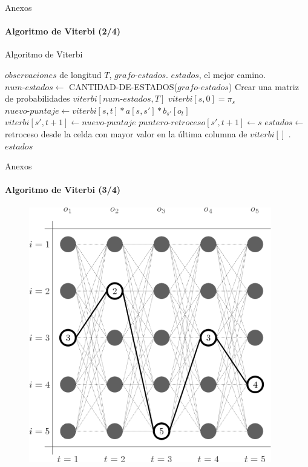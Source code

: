 \begin{frame}[noframenumbering]{Anexos}
\framesubtitle{Algoritmo de Viterbi (2/4)}

\begin{algorithm}[H]
\footnotesize
\caption{Algoritmo de Viterbi} \label{viterbi}
\begin{algorithmic}[1]
\REQUIRE $observaciones$ de longitud $T$, $grafo\mbox{-}estados$.
\ENSURE $estados$, el mejor camino.
\STATE $num\mbox{-}estados \leftarrow$ CANTIDAD-DE-ESTADOS($grafo\mbox{-}estados$) 
\STATE Crear una matriz de probabilidades $viterbi[num\mbox{-}estados, T]$
    \STATE $viterbi[s,0] = \pi_s$
\ENDFOR
{}
        \STATE $nuevo\mbox{-}puntaje \leftarrow viterbi[s,t] * a[s,s'] * b_{s'}[o_t]$
            \STATE $viterbi[s',t+1] \leftarrow nuevo\mbox{-}puntaje$
            \STATE $puntero\mbox{-}retroceso[s',t+1] \leftarrow s$
        \ENDIF  
        \ENDFOR
    \ENDFOR
\ENDFOR
\STATE $estados \leftarrow$ retroceso desde la celda con mayor valor en la \'ultima columna de $viterbi[]$
.
\RETURN $estados$
\end{algorithmic}
\end{algorithm}
\end{frame}

\begin{frame}[noframenumbering]{Anexos}
\framesubtitle{Algoritmo de Viterbi (3/4)}
\begin{figure}[H]
\centering
\includegraphics[width=0.6\linewidth]{./graphics/hmm-viterbi2.png}
\end{figure}
\end{frame}

